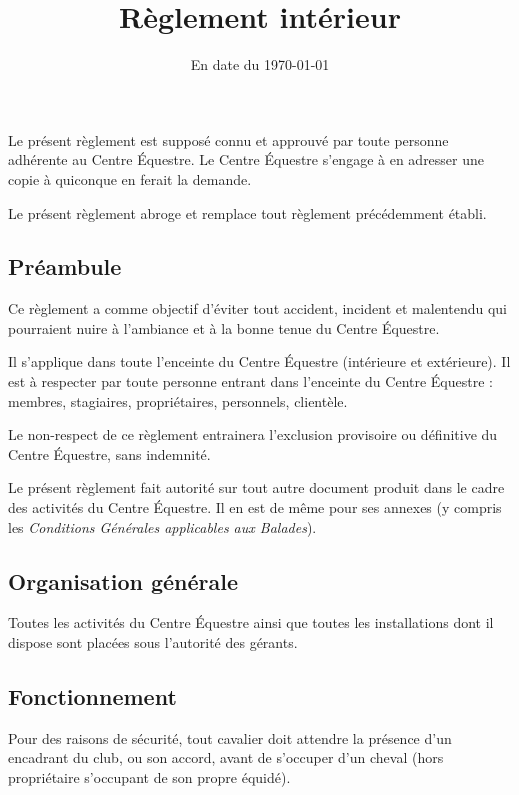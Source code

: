 \documentclass[11pt,a4paper]{article}
\title[Règlement intérieur -- version du \today]{Règlement intérieur}
\subtitle{En date du \today}
\author{}
\date{}
\begin{document}

\maketitle


Le présent règlement est supposé connu et approuvé par toute personne adhérente au Centre Équestre.
Le Centre Équestre s'engage à en adresser une copie à quiconque en ferait la demande.

Le présent règlement abroge et remplace tout règlement précédemment établi.

\subsection*{Préambule}

Ce règlement a comme objectif d'éviter tout accident, incident et malentendu qui pourraient nuire à l'ambiance et à la bonne tenue du Centre Équestre.

Il s'applique dans toute l'enceinte du Centre Équestre (intérieure et extérieure).
Il est à respecter par toute personne entrant dans l'enceinte du Centre Équestre : membres, stagiaires, propriétaires, personnels, clientèle.

Le non-respect de ce règlement entrainera l'exclusion provisoire ou définitive du Centre Équestre, sans indemnité.

Le présent règlement fait autorité sur tout autre document produit dans le cadre des activités du Centre Équestre.
Il en est de même pour ses annexes (y compris les \textit{Conditions Générales applicables aux Balades}).

\subsection{Organisation générale}\label{subsec:organisation-generale}
Toutes les activités du Centre Équestre ainsi que toutes les installations dont il dispose sont placées sous l'autorité des gérants.

\subsection{Fonctionnement}\label{subsec:fonctionnement}
Pour des raisons de sécurité, tout cavalier doit attendre la présence d'un encadrant du club, ou son accord, avant de s'occuper d'un cheval (hors propriétaire s'occupant de son propre équidé).
\end{document}
